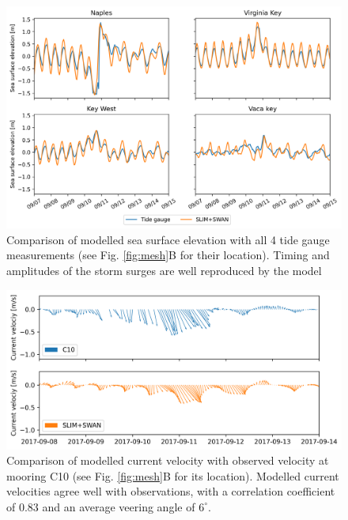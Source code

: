 \documentclass[11pt,a4paper]{article}
\begin{document}
\begin{figure}
    \centering
    \includegraphics[width=\textwidth]{fig/elevation_with_map.png}
    \caption{Comparison of modelled sea surface elevation with all 4 tide gauge measurements (see Fig. \ref{fig:mesh}B for their location). Timing and amplitudes of the storm surges are well reproduced by the model}
    \label{fig:sse}
\end{figure}
\begin{figure}
    \includegraphics[width=\textwidth]{fig/validation_currents_C10_ww3.png}
    \caption{Comparison of modelled current velocity with observed velocity at mooring C10 (see Fig. \ref{fig:mesh}B for its location). Modelled current velocities agree well with observations, with a correlation coefficient of 0.83 and an average veering angle of $6^\circ$.}
    \label{fig:uv}
\end{figure}
\end{document}
